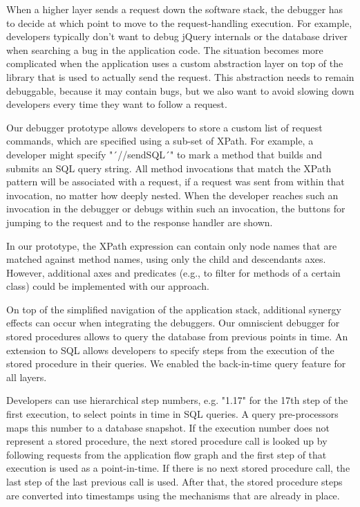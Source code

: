 When a higher layer sends a request down the software stack, the debugger has to decide at which point to move to the request-handling execution.
For example, developers typically don't want to debug jQuery internals or the database driver when searching a bug in the application code.
The situation becomes more complicated when the application uses a custom abstraction layer on top of the library that is used to actually send the request.
This abstraction needs to remain debuggable, because it may contain bugs, but we also want to avoid slowing down developers every time they want to follow a request.

Our debugger prototype allows developers to store a custom list of request commands, which are specified using a sub-set of XPath.
For example, a developer might specify "´//sendSQL´" to mark a method that builds and submits an SQL query string.
All method invocations that match the XPath pattern will be associated with a request, if a request was sent from within that invocation, no matter how deeply nested.
When the developer reaches such an invocation in the debugger or debugs within such an invocation, the buttons for jumping to the request and to the response handler are shown.

In our prototype, the XPath expression can contain only node names that are matched against method names, using only the child and descendants axes.
However, additional axes and predicates (e.g., to filter for methods of a certain class) could be implemented with our approach.

On top of the simplified navigation of the application stack, additional synergy effects can occur when integrating the debuggers.
Our omniscient debugger for stored procedures allows to query the database from previous points in time.%
An extension to SQL allows developers to specify steps from the execution of the stored procedure in their queries.
We enabled the back-in-time query feature for all layers.

Developers can use hierarchical step numbers, e.g. "1.17" for the 17th step of the first execution, to select points in time in SQL queries.
A query pre-processors maps this number to a database snapshot.
If the execution number does not represent a stored procedure, the next stored procedure call is looked up by following requests from the application flow graph and the first step of that execution is used as a point-in-time.
If there is no next stored procedure call, the last step of the last previous call is used.
After that, the stored procedure steps are converted into timestamps using the mechanisms that are already in place.


